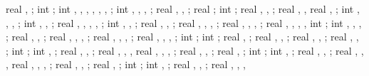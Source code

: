 {{real \supershadespace, \supershadeopacity;
int \showsupershade;
int \showlessbays, \leftbays, \rightbays, \startcol, \endcol, \startbeam, \endbeam;
int \showshearwall, \shearwallbay, \shearwallstartcolumn, \shearwallendcolumn;
real \shearwallstartx, \shearwallstarty \shearwalldeltax, \shearwalldeltay;
real \shearwalllinet;
int \showmarksuper;
real \marksuperexspace, \marksuperrad, \marksuperlinet;
real \marksuperleftstartx, \marksuperleftstarty,
real \marksuperdeltax, \marksuperdeltay;
int \leftstory, \leftlevel, \rightstory, \rightlevel;
int \leftopenstory, \rightopenstory, \showopenstory;
real \leftwallh, \leftopenh, \rightwallh, \rightopenh, \diffwallh;
int \showphorizontalsprings, \phorspringnumber, \phormirrorspring;
real \phorspringspace, \phorspringstartratio, \phorspringendratio;
real \phortextshiftx, \phortextshifty, \phorprelenratio, \phorpostlenratio;
real \phorsegm, \phorsprwid, \phorsprscale, \phorsprlinethk;
real \phorsuppwidth, \phorsuppdepth, \phorsupplinethk, \phorspringlength,
int \phorshowsuppshade;
int \showpverticalsprings, \pverspringnumber, \pvershowlastspring, \pvermirrorspring;
real \pverspringspace, \pverspringstartratio, \pverspringendratio;
real \pvertextshiftx, \pvertextshifty, \pverprelenratio, \pverpostlenratio;
real \pverampl, \pversegm, \pverspringscale, \pverspringthk;
real \pversuppwidth, \pversuppdepth, \pversupplinethk, \pverspbtwspr;
int \pvershowsuppshade;
int \showpaxialspring;
real \pvertextshiftx, \pvertextshifty;
real \paxialspringlength, \paxialspringprelenratio, \paxialspringpostlenratio;
real \paxialspringsegm, \paxialspringwidth, \paxialspringlinethk;
real \paxialsuppwidth, \paxialsuppdepth, \paxialsupplinethk;
int \paxialshowsuppshade;
int \leftwshowsprings, \leftwspringnumber;
real \leftwspringspace, \leftwspringstartratio, \leftwspringendratio;
real \leftwtextshiftx, \leftwtextshifty, \leftwspringlength,
real \leftwprelenratio, \leftwpostlenratio, \leftwampl, \leftwsegm;
real \leftwspringscale, \leftwspringthk, \leftwsuppwidth;
real \leftwsuppdepth, \leftwsupplinethk;
int \leftwshowsuppshade;
int \rightwshowsprings, \rightwspringnumber;
real \rightwspringspace, \rightwspringstartratio, \rightwspringendratio;
real \rightwtextshiftx, \rightwtextshifty, \rightwspringlength,
real \rightwprelenratio, \rightwpostlenratio, \rightwampl, \rightwsegm;
real \rightwspringscale, \rightwspringthk, \rightwsuppwidth;
real \rightwsuppdepth, \rightwsupplinethk;
int \rightwshowsuppshade;
int \foundshowsprings, \foundspringnumber;
real \foundspringspace, \foundspringstartratio, \foundspringendratio;
real \foundtextshiftx, \foundtextshifty, \foundspringlength,
}}

